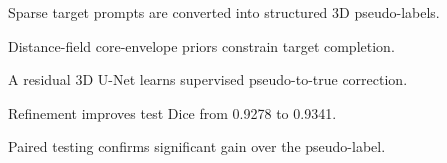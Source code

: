 \begin{highlights}
\item Sparse target prompts are converted into structured 3D pseudo-labels.
\item Distance-field core-envelope priors constrain target completion.
\item A residual 3D U-Net learns supervised pseudo-to-true correction.
\item Refinement improves test Dice from 0.9278 to 0.9341.
\item Paired testing confirms significant gain over the pseudo-label.
\end{highlights}
